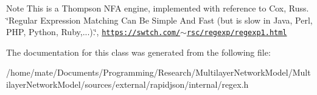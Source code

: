 \begin{DoxyNote}{Note}
This is a Thompson N\+FA engine, implemented with reference to Cox, Russ. \char`\"{}\+Regular Expression Matching Can Be Simple And Fast (but is slow in Java, Perl, P\+H\+P, Python, Ruby,...).\char`\"{}, \href{https://swtch.com/~rsc/regexp/regexp1.html}{\tt https\+://swtch.\+com/$\sim$rsc/regexp/regexp1.\+html} 
\end{DoxyNote}


The documentation for this class was generated from the following file\+:\begin{DoxyCompactItemize}
\item 
/home/mate/\+Documents/\+Programming/\+Research/\+Multilayer\+Network\+Model/\+Multilayer\+Network\+Model/sources/external/rapidjson/internal/regex.\+h\end{DoxyCompactItemize}
